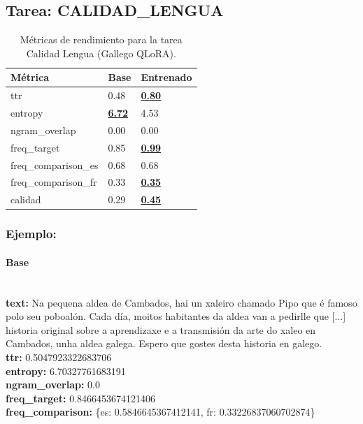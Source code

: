 \subsection{Tarea: CALIDAD\_LENGUA}\label{tarea-calidad_lengua}
\begin{longtable}[]{@{}lll@{}}
\toprule\noalign{}
Métrica & Base & Entrenado \\
\midrule\noalign{}
\endhead
\bottomrule\noalign{}
\caption{Métricas de rendimiento para la tarea Calidad Lengua (Gallego QLoRA).}
\label{tab:metricas_calidad_lengua_Gallego QLoRA}
\endlastfoot
ttr & 0.48 & \textbf{\underline{0.80}} \\
entropy & \textbf{\underline{6.72}} & 4.53 \\
ngram\_overlap & 0.00 & 0.00 \\
freq\_target & 0.85 & \textbf{\underline{0.99}} \\
freq\_comparison\_es & 0.68 & 0.68 \\
freq\_comparison\_fr & 0.33 & \textbf{\underline{0.35}} \\
calidad & 0.29 & \textbf{\underline{0.45}} \\
\end{longtable}

\subsubsection{Ejemplo:}

\paragraph{Base}~\\
\textbf{text:} Na pequena aldea de Cambados, hai un xaleiro chamado Pipo que é famoso polo seu poboalón. Cada día, moitos habitantes da aldea van a pedirlle que  [...] historia original sobre a aprendizaxe e a transmisión da arte do xaleo en Cambados, unha aldea galega. Espero que gostes desta historia en galego.\\
\textbf{ttr:} 0.5047923322683706\\
\textbf{entropy:} 6.70327761683191\\
\textbf{ngram\_overlap:} 0.0\\
\textbf{freq\_target:} 0.8466453674121406\\
\textbf{freq\_comparison:} \{\textquotesingle{}es\textquotesingle{}: 0.5846645367412141, \textquotesingle{}fr\textquotesingle{}: 0.33226837060702874\}

